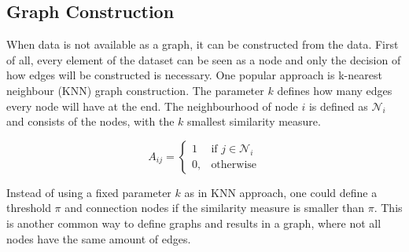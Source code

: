 %
%
%

\subsection{Graph Construction}
\label{sec:graphConstruction}
When data is not available as a graph, it can be constructed from the data.
First of all, every element of the dataset can be seen as a node and only the decision of how edges will be constructed
is necessary. One popular approach is k-nearest neighbour (KNN) graph construction. The parameter $k$
defines how many edges every node will have at the end. The neighbourhood of node $i$ is defined
as $\mathcal{N}_i$ and consists of the nodes, with the $k$ smallest similarity measure.

\begin{equation}
    \label{eg:knn}
    A_{ij} =    
    \begin{cases}
        1  & \text{if } j \in \mathcal{N}_i \\
        0, & \text{otherwise}
    \end{cases}
\end{equation}

Instead of using a fixed parameter $k$ as in KNN approach, one could define a threshold $\pi$
and connection nodes if the similarity measure is smaller than $\pi$. This is another common way
to define graphs and results in a graph, where not all nodes have the same amount of edges.

